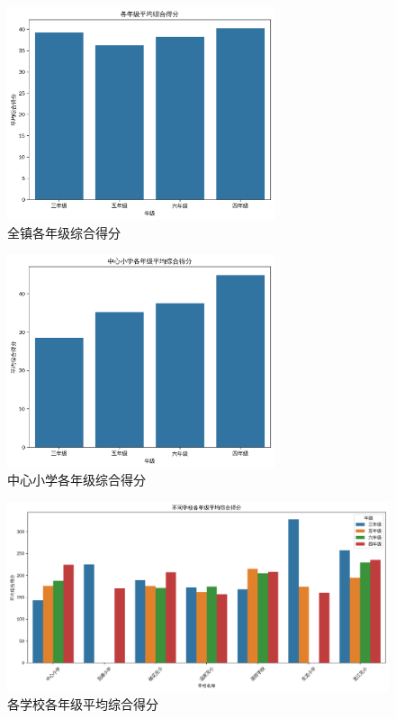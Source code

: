 \documentclass{article}
\begin{document}
\begin{figure}[H]
    \centering
    \includegraphics[width=0.7\textwidth]{fig/4.png}
    \caption{全镇各年级综合得分}
\end{figure}

\begin{figure}[H]
    \centering
    \includegraphics[width=0.7\textwidth]{fig/5.png}
    \caption{中心小学各年级综合得分}
\end{figure}

\begin{figure}[H]
    \centering
    \includegraphics[width=1\textwidth]{fig/6.png}
    \caption{各学校各年级平均综合得分}
\end{figure}
\end{document}
